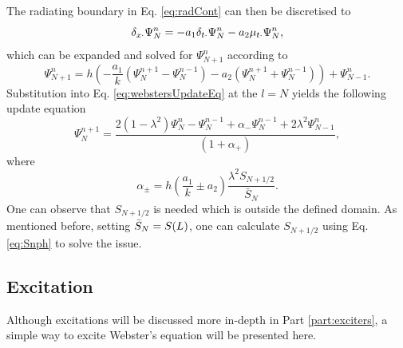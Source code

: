 The radiating boundary in Eq. \eqref{eq:radCont} can then be discretised to \cite{theBible}
\begin{equation}\label{eq:centRadBound}
    \delta_{x\cdot}\Psi_N^n = -a_1\delta_{t\cdot}\Psi_N^n - a_2\mu_{t\cdot}\Psi_N^n,
\end{equation}
which can be expanded and solved for $\Psi_{N+1}^n$ according to
\begin{equation}
    \Psi_{N+1}^n = h\left(-\frac{a_1}{k}(\Psi_N^{n+1} - \Psi_N^{n-1}) - a_2(\Psi_N^{n+1} + \Psi_N^{n-1})\right) + \Psi_{N-1}^n.
\end{equation}
Substitution into Eq. \eqref{eq:webstersUpdateEq} at the $l=N$ yields the following update equation
\begin{equation}
    \Psi_N^{n+1} = \frac{2(1-\lambda^2)\Psi_N^n-\Psi_N^{n-1}+\alpha_-\Psi_N^{n-1} + 2\lambda^2\Psi_{N-1}^n}{\left(1+\alpha_+\right)},
\end{equation}
where
\begin{equation}
    \alpha_\pm = h\left(\frac{a_1}{k}\pm a_2\right)\frac{\lambda^2S_{N+1/2}}{\bar S_N}.
\end{equation}
One can observe that $S_{N+1/2}$ is needed which is outside the defined domain. As mentioned before, setting $\bar{S}_N = S(L)$, one can calculate $S_{N+1/2}$ using Eq. \eqref{eq:Snph} to solve the issue. 

\subsection{Excitation}\label{sec:webstersExcitation}
Although excitations will be discussed more in-depth in Part \ref{part:exciters}, a simple way to excite Webster's equation will be presented here.

